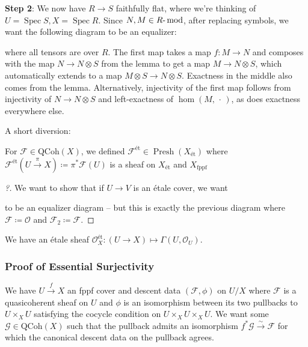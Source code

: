 \textbf{Step 2}: We now have \(R\to S\) faithfully flat, where we're
thinking of \(U = \operatorname{Spec}S, X = \operatorname{Spec}R\).
Since \(N, M \in {R{\hbox{-}}\operatorname{mod}}\), after replacing
symbols, we want the following diagram to be an equalizer:

where all tensors are over \(R\). The first map takes a map \(f:M\to N\)
and composes with the map \(N\to N\otimes S\) from the lemma to get a
map \(M\to N\otimes S\), which automatically extends to a map
\(M\otimes S \to N\otimes S\). Exactness in the middle also comes from
the lemma. Alternatively, injectivity of the first map follows from
injectivity of \(N\to N\otimes S\) and left-exactness of
\(\hom(M, {\,\cdot\,})\), as does exactness everywhere else.

A short diversion:

\begin{corollary}[of proof]

For \(\mathcal{F}\in {\mathrm{QCoh}}(X)\), we defined
\(\mathcal{F}^{\text{ét}} \in {\operatorname{Presh}}(X_{\text{ét}})\)
where
\(\mathcal{F}^{\text{ét}}(U\xrightarrow{\pi }X) \coloneqq\pi^* \mathcal{F}(U)\)
is a sheaf on \(X_{\text{ét}}\) and \(X_{\mathrm{\operatorname{fppf}}}\)

\end{corollary}

\begin{proof}[?]

We want to show that if \(U\to V\) is an étale cover, we want

to be an equalizer diagram -- but this is exactly the previous diagram
where \(\mathcal{F}\coloneqq{\mathcal{O}}\) and
\(\mathcal{F}_2 \coloneqq\mathcal{F}\).

\end{proof}

\begin{example}[?]

We have an étale sheaf
\({\mathcal{O}}_{X}^{\text{ét}}: (U\to X) \mapsto \Gamma(U, {\mathcal{O}}_U)\).

\end{example}

\hypertarget{proof-of-essential-surjectivity}{%
\subsubsection{Proof of Essential
Surjectivity}\label{proof-of-essential-surjectivity}}

We have \(U\xrightarrow{f} X\) an fppf cover and descent data
\((\mathcal{F}, \phi)\) on \(U/X\) where \(\mathcal{F}\) is a
quasicoherent sheaf on \(U\) and \(\phi\) is an isomorphism between its
two pullbacks to \(U\times_X U\) satisfying the cocycle condition on
\(U\times_X U \times_X U\). We want some
\(\mathcal{G} \in {\mathrm{QCoh}}(X)\) such that the pullback admits an
isomorphism \(f^* \mathcal{G} \xrightarrow{\sim}\mathcal{F}\) for which
the canonical descent data on the pullback agrees.

